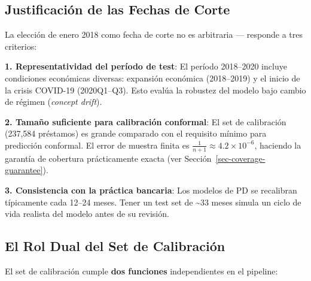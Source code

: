 \documentclass[
  spanish,
  11pt,
  letterpaper,
]{scrbook}
\theoremstyle{plain}
\theoremstyle{remark}
\begin{document}
\subsection{Justificación de las Fechas de
Corte}\label{sec-cutoff-dates}

La elección de enero 2018 como fecha de corte no es arbitraria ---
responde a tres criterios:

\textbf{1. Representatividad del período de test}: El período 2018--2020
incluye condiciones económicas diversas: expansión económica
(2018--2019) y el inicio de la crisis COVID-19 (2020Q1--Q3). Esto evalúa
la robustez del modelo bajo cambio de régimen (\emph{concept drift}).

\textbf{2. Tamaño suficiente para calibración conformal}: El set de
calibración (237,584 préstamos) es grande comparado con el requisito
mínimo para predicción conformal. El error de muestra finita es
\(\frac{1}{n+1} \approx 4.2 \times 10^{-6}\), haciendo la garantía de
cobertura prácticamente exacta (ver
Sección~\ref{sec-coverage-guarantee}).

\textbf{3. Consistencia con la práctica bancaria}: Los modelos de PD se
recalibran típicamente cada 12--24 meses. Tener un test set de
\textasciitilde33 meses simula un ciclo de vida realista del modelo
antes de su revisión.

\subsection{El Rol Dual del Set de
Calibración}\label{sec-calibration-role}

El set de calibración cumple \textbf{dos funciones} independientes en el
pipeline:
\end{document}
